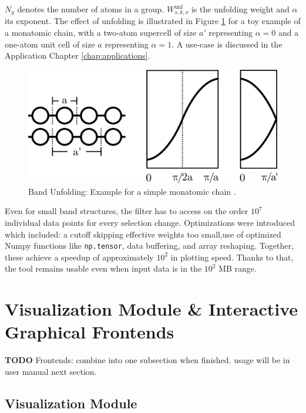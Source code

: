 \(N_g\) denotes the number of atoms in a group. \(W_{s,k,\nu}^{\text{unf}}\) is
the unfolding weight and \(\alpha\) its exponent. The effect of unfolding is
illustrated in Figure \ref{fig:unfolding} for a toy example of a monatomic
chain, with a two-atom supercell of size \(a'\) representing \(\alpha=0\) and a
one-atom unit cell of size \(a\) representing \(\alpha=1\). A use-case is
discussed in the Application Chapter \ref{chap:applications}.

\begin{figure}[htb!]
    \centering
    \includegraphics[width=0.6\linewidth]{fig/unfolding.png}
    \caption[Band Unfolding]{Band Unfolding: Example for a simple monatomic
      chain \cite{hoffmann1987chemistry}.}
    \label{fig:unfolding}
\end{figure}

Even for small band structures, the filter has to access on the order \(10^7\)
individual data points for every selection change. Optimizations were introduced
which included: a cutoff skipping effective weights too small,use of optimized
Numpy functions like \texttt{np.tensor}, data buffering, and array reshaping.
Together, these achieve a speedup of approximately \(10^2\) in plotting speed.
Thanks to that, the tool remains usable even when input data is in the \(10^2\)
MB range.

\section{Visualization Module \& Interactive Graphical Frontends}
\label{sec:visualization-module}

\textbf{TODO} Frontends: combine into one subsection when finished. usage will
be in user manual next section.

\subsection{Visualization Module}
\label{sec:visualization-interface}

